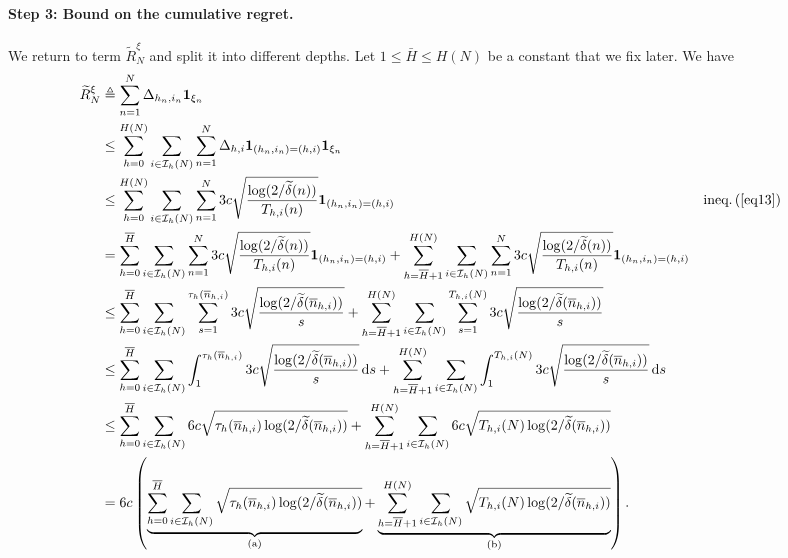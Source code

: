 \paragraph{Step 3: Bound on the cumulative regret.}
We return to  term $\tilde{R}_N^{\xi}$ and split it into different depths. Let $1\leq \bar{H} \leq H(N)$ be a constant that we  fix later. We have
\begin{align*}
    \widetilde{R}_N^{\xi} &\triangleq \sum_{n=1}^N \Delta_{h_n,i_n} {\bf 1}_{\xi_n} \\
                              &\leq \sum_{h=0}^{H(N)}\sum_{i\in\mathcal{I}_h(N)}\sum_{n=1}^N \Delta_{h,i} {\bf 1}_{(h_n,i_n)=(h,i)} {\bf 1}_{\xi_n} \\
                              &\leq \sum_{h=0}^{H(N)}\sum_{i\in\mathcal{I}_h(N)}\sum_{n=1}^N 3c\sqrt{\frac{\log(2/\widetilde{\delta}(n))}{T_{h,i}(n)}} {\bf 1}_{(h_n,i_n)=(h,i)} && \text{ineq.\,(\ref{eq13})} \\
                              &= \sum_{h=0}^{\overline{H}}\sum_{i\in\mathcal{I}_h(N)}\sum_{n=1}^N 3c\sqrt{\frac{\log(2/\widetilde{\delta}(n))}{T_{h,i}(n)}} {\bf 1}_{(h_n,i_n)=(h,i)} + \sum_{h=\overline{H}+1}^{H(N)}\sum_{i\in\mathcal{I}_h(N)}\sum_{n=1}^N 3c\sqrt{\frac{\log(2/\widetilde{\delta}(n))}{T_{h,i}(n)}} {\bf 1}_{(h_n,i_n)=(h,i)} \\
                              &\leq \sum_{h=0}^{\overline{H}}\sum_{i\in\mathcal{I}_h(N)}\sum_{s=1}^{\tau_h(\overline{n}_{h,i})} 3c\sqrt{\frac{\log(2/\widetilde{\delta}(\overline{n}_{h,i}))}{s}} + \sum_{h=\overline{H}+1}^{H(N)}\sum_{i\in\mathcal{I}_h(N)}\sum_{s=1}^{T_{h,i}(N)} 3c\sqrt{\frac{\log(2/\widetilde{\delta}(\overline{n}_{h,i}))}{s}} \\
                              &\leq \sum_{h=0}^{\overline{H}}\sum_{i\in\mathcal{I}_h(N)}\int_{1}^{\tau_h(\overline{n}_{h,i})} 3c\sqrt{\frac{\log(2/\widetilde{\delta}(\overline{n}_{h,i}))}{s}} \, \mathrm{d}s + \sum_{h=\overline{H}+1}^{H(N)}\sum_{i\in\mathcal{I}_h(N)}\int_{1}^{T_{h,i}(N)} 3c\sqrt{\frac{\log(2/\widetilde{\delta}(\overline{n}_{h,i}))}{s}} \, \mathrm{d}s \\
                              &\leq \sum_{h=0}^{\overline{H}}\sum_{i\in\mathcal{I}_h(N)} 6c\sqrt{\tau_h(\overline{n}_{h,i})\log(2/\widetilde{\delta}(\overline{n}_{h,i}))} + \sum_{h=\overline{H}+1}^{H(N)}\sum_{i\in\mathcal{I}_h(N)} 6c\sqrt{T_{h,i}(N)\log(2/\widetilde{\delta}(\overline{n}_{h,i}))} \\
                              &= 6c\left(\underbrace{\sum_{h=0}^{\overline{H}}\sum_{i\in\mathcal{I}_h(N)} \sqrt{\tau_h(\overline{n}_{h,i})\log(2/\widetilde{\delta}(\overline{n}_{h,i}))}}_\text{(a)} + \underbrace{\sum_{h=\overline{H}+1}^{H(N)}\sum_{i\in\mathcal{I}_h(N)} \sqrt{T_{h,i}(N)\log(2/\widetilde{\delta}(\overline{n}_{h,i}))}}_\text{(b)}\right).
\end{align*}
